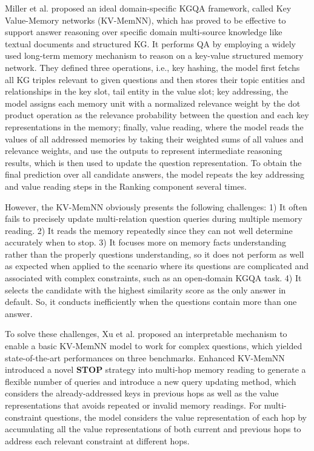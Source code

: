 \documentclass[pdflatex,sn-mathphys]{sn-jnl}%
\theoremstyle{thmstyleone}%
\theoremstyle{thmstyletwo}%
\theoremstyle{thmstylethree}%
\begin{document}
Miller et al. \cite{kvmem} proposed an ideal domain-specific KGQA framework, called Key Value-Memory networks (KV-MemNN), which has proved to be effective to support answer reasoning over specific domain multi-source knowledge like textual documents and structured KG. It performs QA by employing a widely used long-term memory mechanism to reason on a key-value structured memory network. 
They defined three operations, i.e., key hashing, the model first fetchs all KG triples relevant to given questions and then stores their topic entities and relationships in the key slot, tail entity in the value slot; key addressing, the model assigns each memory unit with a normalized relevance weight by the dot product operation as the relevance probability between the question and each key representations in the memory; finally, value reading, where the model reads the values of all addressed memories by taking their weighted sums of all values and relevance weights, and use the outputs to represent intermediate reasoning results, which is then used to update the question representation. To obtain the final prediction over all candidate answers, the model repeats the key addressing and value reading steps in the Ranking component several times. 

However, the KV-MemNN obviously presents the following challenges: 1) It often fails to precisely update multi-relation question queries during multiple memory reading. 2) It reads the memory repeatedly since they can not well determine accurately when to stop. 3) It focuses more on memory facts understanding rather than the properly questions understanding, so it does not perform as well as expected when applied to the scenario where its questions are complicated and associated with complex constraints, such as an open-domain KGQA task. 4) It selects the candidate with the highest similarity score as the only answer in default. So, it conducts inefficiently when the questions contain more than one answer.

To solve these challenges, Xu et al. \cite{enhancedkvmem} proposed an interpretable mechanism to enable a basic KV-MemNN model to work for complex questions, which yielded state-of-the-art performances on three benchmarks. Enhanced KV-MemNN introduced a novel \textbf{STOP} strategy into multi-hop memory reading to generate a flexible number of queries and introduce a new query updating method, which considers the already-addressed keys in previous hops as well as the value representations that avoids repeated or invalid memory readings. For multi-constraint questions, the model considers the value representation of each hop by accumulating all the value representations of both current and previous hops to address each relevant constraint at different hops.
\end{document}
